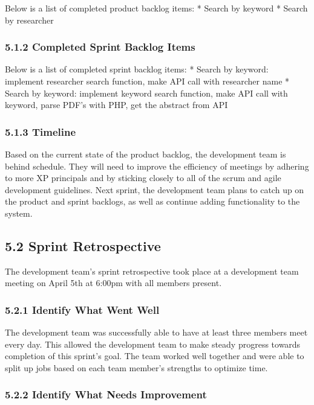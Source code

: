 \documentclass[]{article}
\begin{document}
Below is a list of completed product backlog items: * Search by keyword
* Search by researcher

\subsubsection{5.1.2 Completed Sprint Backlog
Items}\label{completed-sprint-backlog-items}

Below is a list of completed sprint backlog items: * Search by keyword:
implement researcher search function, make API call with researcher name
* Search by keyword: implement keyword search function, make API call
with keyword, parse PDF's with PHP, get the abstract from API

\subsubsection{5.1.3 Timeline}\label{timeline}

Based on the current state of the product backlog, the development team
is behind schedule. They will need to improve the efficiency of meetings
by adhering to more XP principals and by sticking closely to all of the
scrum and agile development guidelines. Next sprint, the development
team plans to catch up on the product and sprint backlogs, as well as
continue adding functionality to the system.

\subsection{5.2 Sprint Retrospective}\label{sprint-retrospective}

The development team's sprint retrospective took place at a development
team meeting on April 5th at 6:00pm with all members present.

\subsubsection{5.2.1 Identify What Went
Well}\label{identify-what-went-well}

The development team was successfully able to have at least three
members meet every day. This allowed the development team to make steady
progress towards completion of this sprint's goal. The team worked well
together and were able to split up jobs based on each team member's
strengths to optimize time.

\subsubsection{5.2.2 Identify What Needs
Improvement}\label{identify-what-needs-improvement}
\end{document}
